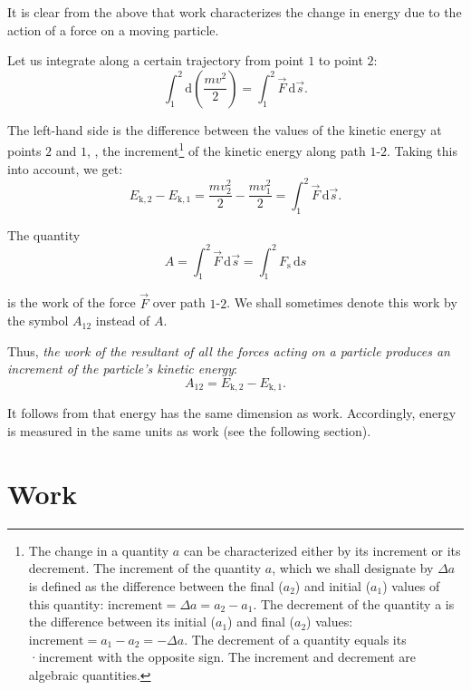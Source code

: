 \noindent
It is clear from the above that work characterizes the change in energy due to the action of a force on a moving particle.

Let us integrate  along a certain trajectory from point $1$ to point $2$:
\begin{equation*}
\int_{1}^{2} \mathrm{d}\!\left(\frac{mv^2}{2}\right) = \int_{1}^{2} \vec{F}\,\mathrm{d}\vec{s}.
\end{equation*}

\noindent
The left-hand side is the difference between the values of the kinetic energy at points $2$ and $1$, \ie, the increment\footnote{The change in a quantity $a$ can be characterized either by its increment or its decrement. The increment of the quantity $a$, which we shall designate by $\Delta a$ is defined as the difference between the final ($a_2$) and initial ($a_1$) values of this quantity: $\text{increment}=\Delta a=a_2-a_1$. The decrement of the quantity a is the difference between its initial ($a_1$) and final ($a_2$) values: $\text{increment}=a_1-a_2=-\Delta a$. The decrement of a quantity equals its ·increment with the opposite sign. The increment and decrement are algebraic quantities.} of the kinetic energy along path $1$-$2$. Taking this into account, we get:
\begin{equation}\label{eq:3_9}
E_{\text{k},2} - E_{\text{k},1} = \frac{mv^2_2}{2} - \frac{mv^2_1}{2} = \int_{1}^{2} \vec{F}\,\mathrm{d}\vec{s}.
\end{equation}

The quantity
\begin{equation}\label{eq:3_10}
A = \int_{1}^{2} \vec{F}\,\mathrm{d}\vec{s} = \int_{1}^{2} F_{\text{s}}\,\mathrm{d}s
\end{equation}

\noindent
is the work of the force $\vec{F}$ over path $1$-$2$. We shall sometimes denote this work by the symbol $A_{12}$ instead of $A$.

Thus, \textit{the work of the resultant of all the forces acting on a particle produces an increment of the particle's kinetic energy}:
\begin{equation}\label{eq:3_11}
A_{12} = E_{\text{k},2} - E_{\text{k},1}.
\end{equation}

\noindent
It follows from  that energy has the same dimension as work. Accordingly, energy is measured in the same units as work (see the following section).

\section{Work}\label{sec:3_3}

